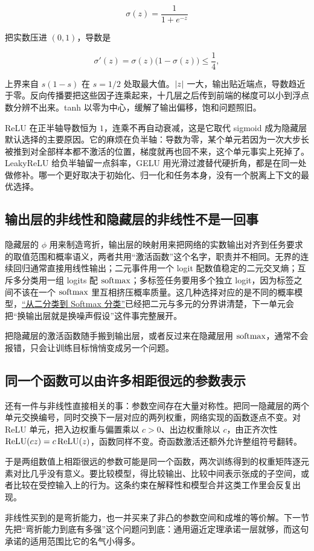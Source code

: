 \[
\sigma(z)=\frac{1}{1+e^{-z}}
\]

把实数压进 \((0,1)\)，导数是

\[
\sigma'(z)=\sigma(z)\bigl(1-\sigma(z)\bigr)\le\frac14 ,
\]

上界来自 \(s(1-s)\) 在 \(s=1/2\) 处取最大值。\(\left|z\right|\) 一大，输出贴近端点，导数趋近于零。反向传播要把这些因子连乘起来，十几层之后传到前端的梯度可以小到浮点数分辨不出来。tanh 以零为中心，缓解了输出偏移，饱和问题照旧。

ReLU 在正半轴导数恒为 \(1\)，连乘不再自动衰减，这是它取代 sigmoid 成为隐藏层默认选择的主要原因。它的麻烦在负半轴：导数为零，某个单元若因为一次大步长被推到对全部样本都不激活的位置，梯度就再也回不来，这个单元事实上死掉了。LeakyReLU 给负半轴留一点斜率，GELU 用光滑过渡替代硬折角，都是在同一处做修补。哪一个更好取决于初始化、归一化和任务本身，没有一个脱离上下文的最优选择。

\subsection{输出层的非线性和隐藏层的非线性不是一回事}

隐藏层的 \(\phi\) 用来制造弯折，输出层的映射用来把网络的实数输出对齐到任务要求的取值范围和概率语义，两者共用``激活函数''这个名字，职责并不相同。无界的连续回归通常直接用线性输出；二元事件用一个 logit 配数值稳定的二元交叉熵；互斥多分类用一组 logits 配 \(\operatorname{softmax}\)；多标签任务要用多个独立 logit，因为标签之间不该在一个 \(\operatorname{softmax}\) 里互相挤压概率质量。这几种选择对应的是不同的概率模型，\hyperref[sec:13-Machine-Learning/02-Linear-Models/03]{``从二分类到 Softmax 分类''}已经把二元与多元的分界讲清楚，下一单元会把``换输出层就是换噪声假设''这件事完整展开。

把隐藏层的激活函数随手搬到输出层，或者反过来在隐藏层用 \(\operatorname{softmax}\)，通常不会报错，只会让训练目标悄悄变成另一个问题。

\subsection{同一个函数可以由许多相距很远的参数表示}

还有一件与非线性直接相关的事：参数空间存在大量对称性。把同一隐藏层的两个单元交换编号，同时交换下一层对应的两列权重，网络实现的函数逐点不变。对 ReLU 单元，把入边权重与偏置乘以 \(c>0\)、出边权重除以 \(c\)，由正齐次性 \(\operatorname{ReLU}(cz)=c\operatorname{ReLU}(z)\)，函数同样不变。奇函数激活还额外允许整组符号翻转。

于是两组数值上相距很远的参数可能是同一个函数，两次训练得到的权重矩阵逐元素对比几乎没有意义。要比较模型，得比较输出、比较中间表示张成的子空间，或者比较在受控输入上的行为。这条约束在解释性和模型合并这类工作里会反复出现。

非线性买到的是弯折能力，也一并买来了非凸的参数空间和成堆的等价解。下一节先把``弯折能力到底有多强''这个问题问到底：通用逼近定理承诺一层就够，而这句承诺的适用范围比它的名气小得多。
